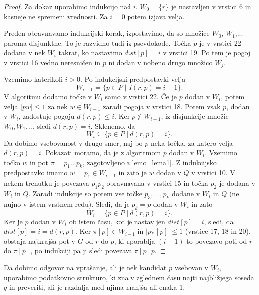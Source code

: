 \documentclass[a4paper, 12pt]{book}
\begin{document}
\begin{proof}
Za dokaz uporabimo indukcijo nad $i$. $W_0 = \{r\}$ je nastavljen v vrstici 6 in kasneje ne spremeni vrednosti. Za $i = 0$ potem izjava velja.

Preden obravnavamo indukcijski korak, izpostavimo, da so množice $W_0$, $W_1$,... paroma disjunktne. To je razvidno tudi iz psevdokode. Točka $p$  je v vrstici 22 dodana v nek $W_i$ takrat, ko nastavimo $dist[p] = i$ v vrstici 19. Po tem je pogoj v vrstici 16 vedno neresničen in $p$ ni dodan v nobeno drugo množico $W_j$.

Vzemimo katerikoli $i > 0$. Po indukcijski predpostavki velja
\begin{equation*}
W_{i-1} = \{p \in P \mid d(r,p) = i - 1\}.
\end{equation*}
V algoritmu dodamo točke v $W_i$ samo v vrstici 22. Če je $p$ dodan v $W_i$, potem velja $|pw| \leq 1$ za nek $w \in W_{i-1}$ zaradi pogoja v vrstici 18. Potem vsak $p$, dodan v $W_i$, zadostuje pogoju $d(r,p) \leq i$. Ker $p \notin W_{i-1}$, iz disjunkcije množic $W_0, W_1,...$ sledi $d(r,p) = i$. Sklenemo, da
\begin{equation*}
W_i \subseteq \{p \in P \mid d(r,p) = i\}.
\end{equation*}
Da dobimo vsebovanost v drugo smer, naj bo $p$ neka točka, za katero velja $d(r,p) = i$. Pokazati moramo, da je z algoritmom $p$ dodan v $W_i$. Vzemimo točko $w$ in pot $\pi = p_1...p_k$, zagotovljeno z lemo~\ref{lema1}. Z indukcijsko predpostavko imamo $w = p_1 \in W_{i-1}$ in zato je $w$ dodan v $Q$ v vrstici 10. V nekem trenutku je povezava $p_1p_2$ obravnavana v vrstici 15 in točka $p_2$ je dodana v $W_i$ in $Q$. Zaradi indukcije so potem vse točke $p_3,...,p_k$ dodane v $W_i$ in $Q$ (ne nujno v istem vrstnem redu). Sledi, da je $p_k = p$ dodan v $W_i$ in zato
\begin{equation*}
W_i = \{p \in P \mid d(r,p) = i \}.
\end{equation*}
Ker je $p$ dodan v $W_i$ ob istem času, kot je nastavljen $dist[p] = i$, sledi, da $dist[p] = i = d(r,p)$. Ker $\pi[p] \in W_{i-1}$ in $|p\pi[p] | \leq 1$ (vrstice 17, 18 in 20), obstaja najkrajša pot v $G$ od $r$ do $p$, ki uporablja $(i-1)$-to povezavo poti od $r$ do $\pi[p]$, po indukciji pa ji sledi povezava $\pi[p]p$.
\end{proof}


Da dobimo odgovor na vprašanje, ali je nek kandidat $p$ vsebovan v $W_i$, uporabimo podatkovno strukturo, ki zna v zglednem času najti najbližjega soseda $q$ in preveriti, ali je razdalja med njima manjša ali enaka 1.
\end{document}
